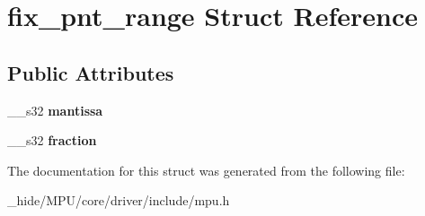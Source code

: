 \hypertarget{structfix__pnt__range}{}\section{fix\+\_\+pnt\+\_\+range Struct Reference}
\label{structfix__pnt__range}
\subsection*{Public Attributes}
\begin{DoxyCompactItemize}
\item 
\hypertarget{structfix__pnt__range_aba264ad3324204317181ad3956a98781}{}\+\_\+\+\_\+s32 {\bfseries mantissa}\label{structfix__pnt__range_aba264ad3324204317181ad3956a98781}

\item 
\hypertarget{structfix__pnt__range_af2265e16409d3d3405aaa81fb1c556c2}{}\+\_\+\+\_\+s32 {\bfseries fraction}\label{structfix__pnt__range_af2265e16409d3d3405aaa81fb1c556c2}

\end{DoxyCompactItemize}


The documentation for this struct was generated from the following file\+:\begin{DoxyCompactItemize}
\item 
\+\_\+hide/\+M\+P\+U/core/driver/include/mpu.\+h\end{DoxyCompactItemize}
